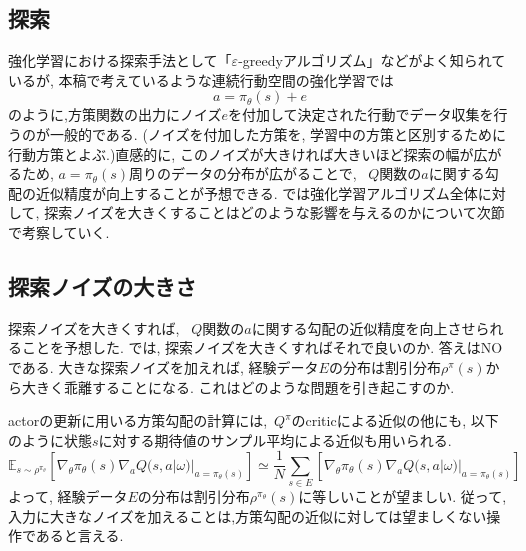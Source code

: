 \documentclass[dvipdfmx]{ampmt}
\newcommand{\expect}{\mathbb{E}}
\begin{document}
\subsection{探索}
強化学習における探索手法として「$\varepsilon$-greedyアルゴリズム」などがよく知られているが,
本稿で考えているような連続行動空間の強化学習では
\begin{equation}
	a = \pi_{\theta}(s) + e
\end{equation}
のように,方策関数の出力にノイズ$e$を付加して決定された行動でデータ収集を行うのが一般的である. (ノイズを付加した方策を, 学習中の方策と区別するために行動方策とよぶ.)直感的に, このノイズが大きければ大きいほど探索の幅が広がるため, $a=\pi_{\theta}(s)$周りのデータの分布が広がることで, ~$Q$関数の$a$に関する勾配の近似精度が向上することが予想できる. では強化学習アルゴリズム全体に対して, 探索ノイズを大きくすることはどのような影響を与えるのかについて次節で考察していく.

\subsection{探索ノイズの大きさ}
探索ノイズを大きくすれば, ~$Q$関数の$a$に関する勾配の近似精度を向上させられることを予想した. では, 探索ノイズを大きくすればそれで良いのか. 答えはNOである. 大きな探索ノイズを加えれば, 経験データ$E$の分布は割引分布$\rho^{\pi}(s)$から大きく乖離することになる. これはどのような問題を引き起こすのか.\par
actorの更新に用いる方策勾配の計算には,~$Q^{\pi}$のcriticによる近似の他にも, 以下のように状態$s$に対する期待値のサンプル平均による近似も用いられる.
\[
\expect_{s\sim\rho^{\pi_{\theta}}}[\nabla_{\theta}\pi_{\theta}(s)\nabla_{a}Q(s, a|\omega)|_{a=\pi_{\theta}(s)}] \simeq \frac{1}{N}\sum_{s\in E}[\nabla_{\theta}\pi_{\theta}(s)\nabla_{a}Q(s, a|\omega)|_{a=\pi_{\theta}(s)}]
\]
よって, 経験データ$E$の分布は割引分布$\rho^{\pi_{\theta}}(s)$に等しいことが望ましい. 従って, 入力に大きなノイズを加えることは,方策勾配の近似に対しては望ましくない操作であると言える.
\end{document}
